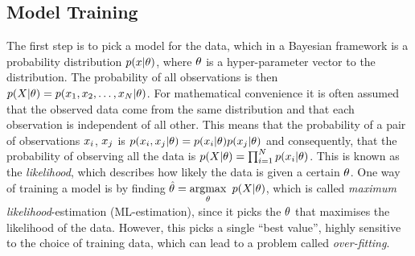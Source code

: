 \subsection{Model Training}
The first step is to pick a model for the data, which in a Bayesian
framework is a probability distribution $p(x \vert \theta)$, where
$\theta$ is a hyper-parameter vector to the distribution. The
probability of all observations is then $p(X \vert \theta) =
p(x_1, x_2, \dots, x_N \vert \theta)$. For
mathematical convenience it is often assumed that the observed data
come from the same distribution and that each observation is
independent of all other. This means that the probability of a pair of observations $x_i$, $x_j$ is $p(x_i, x_j
\vert \theta) = p(x_i \vert \theta)p(x_j
\vert \theta)$ and consequently, that the probability of observing all the data
is $p(X \vert \theta) = \prod_{i=1}^Np(x_i \vert \theta)$.
This is known as the \textit{likelihood}, which describes how likely
the data is given a certain $\theta$. One way of training a model is
by finding $\hat{\theta} = \underset{\theta}{\mathrm{argmax}}$ $p(X \vert \theta)$, 
which is called \textit{maximum likelihood}-estimation (ML-estimation), since it picks the
$\theta$ that maximises the likelihood of the data. However, this picks a single
``best value'', highly sensitive to the choice of training data, which
can lead to a problem called \textit{over-fitting}.

